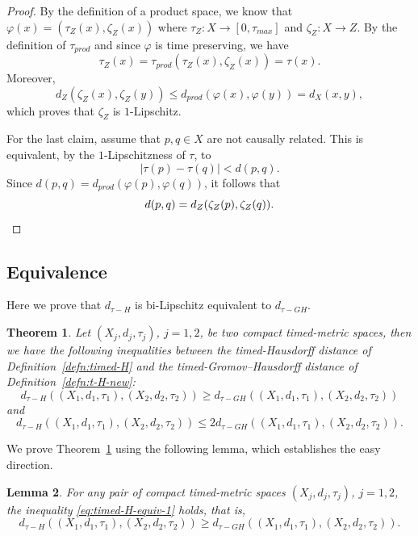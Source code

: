 \documentclass[a4paper,12pt,reqno]{amsart}
\theoremstyle{plain}
\newtheorem{thm}{Theorem}[section]
\newtheorem{lem}[thm]{Lemma}
\newcommand{\be}{\begin{equation}}
\newcommand{\ee}{\end{equation}}
\begin{document}
\begin{proof}
By the definition of a product space,
we know that $\varphi(x)=(\tau_Z(x),\zeta_Z(x))$
where $\tau_Z:X\to [0,\tau_{max}]$
and $\zeta_Z:X\to Z$.  By the definition of $\tau_{prod}$ and since
$\varphi$ is time preserving, we have
\be
\tau_Z(x)=\tau_{prod}(\tau_Z(x),\zeta_Z(x)) =\tau(x).
\ee
Moreover, 
\[
d_Z(\zeta_Z(x),\zeta_Z(y)) \leq d_{prod}(\varphi(x),\varphi(y))=
d_X(x,y),
\]
which proves that $\zeta_Z$ is $1$-Lipschitz.

For the last claim, assume that $p,q\in X$ are not causally related. This is equivalent, by the $1$-Lipschitzness of $\tau$, to
\[
|\tau(p)-\tau(q)| < d(p,q).
\]
Since $d(p,q) = d_{prod}(\varphi(p),\varphi(q))$, it follows that
\[
d(p,q) = d_Z(\zeta_Z(p),\zeta_Z(q)).\qedhere
\]
\end{proof}


\subsection{Equivalence}\label{ss:equivalent notion}

Here we prove that $d_{\tau-H}$
is bi-Lipschitz equivalent to 
$d_{\tau-GH}$.

\begin{thm}\label{thm:timed-H-equiv}
Let $(X_j,d_j,\tau_j)$, $j=1,2$, be
two compact timed-metric spaces,
then we have the following inequalities
between the timed-Hausdorff distance of
Definition~\ref{defn:timed-H} 
and the timed-Gromov--Hausdorff distance of Definition~\ref{defn:t-H-new}:
\be\label{eq:timed-H-equiv-1}
d_{\tau-H}((X_1,d_1,\tau_1),(X_2,d_2,\tau_2))\ge
d_{\tau-GH}((X_1,d_1,\tau_1),(X_2,d_2,\tau_2))
\ee
and
\be\label{eq:timed-H-equiv-2}
d_{\tau-H}((X_1,d_1,\tau_1),(X_2,d_2,\tau_2))\le
2
d_{\tau-GH}((X_1,d_1,\tau_1),(X_2,d_2,\tau_2)).
\ee
\end{thm}

We prove Theorem~\ref{thm:timed-H-equiv} using the following lemma, which establishes the easy direction.



\begin{lem}\label{lem:timed-H-equiv-1}
For any pair of compact timed-metric spaces 
$(X_j,d_j,\tau_j)$, $j=1,2$, the inequality \eqref{eq:timed-H-equiv-1} holds, that is,
\be
d_{\tau-H}((X_1,d_1,\tau_1),(X_2,d_2,\tau_2))\ge
d_{\tau-GH}((X_1,d_1,\tau_1),(X_2,d_2,\tau_2)).
\ee
\end{lem}
\end{document}
